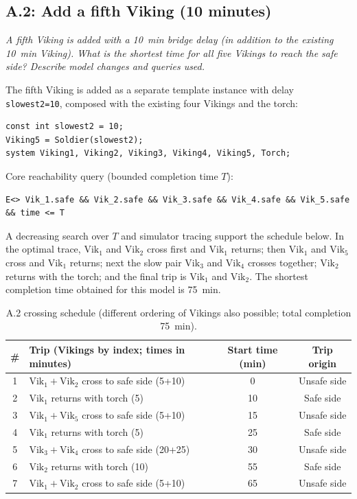 \documentclass[10pt]{article}
\newcommand{\Vik}[1]{\ensuremath{\mathrm{Vik}_{#1}}}
\newcommand{\afterprompt}{\par\medskip}
\begin{document}
\subsection*{A.2: Add a fifth Viking (10 minutes)}
\textit{A fifth Viking is added with a \SI{10}{min} bridge delay (in addition to the existing \SI{10}{min} Viking). What is the shortest time for all five Vikings to reach the safe side? Describe model changes and queries used.}
\afterprompt
The fifth Viking is added as a separate template instance with delay \texttt{slowest2=10}, composed with the existing four Vikings and the torch:
\begin{lstlisting}[style=uppaal]
const int slowest2 = 10;
Viking5 = Soldier(slowest2);
system Viking1, Viking2, Viking3, Viking4, Viking5, Torch;
\end{lstlisting}
Core reachability query (bounded completion time $T$):
\begin{lstlisting}[style=uppaal]
E<> Vik_1.safe && Vik_2.safe && Vik_3.safe && Vik_4.safe && Vik_5.safe && time <= T
\end{lstlisting}
A decreasing search over $T$ and simulator tracing support the schedule below. In the optimal trace, $\Vik{1}$ and $\Vik{2}$ cross first and $\Vik{1}$ returns; then $\Vik{1}$ and $\Vik{5}$ cross and $\Vik{1}$ returns; next the slow pair $\Vik{3}$ and $\Vik{4}$ crosses together; $\Vik{2}$ returns with the torch; and the final trip is $\Vik{1}$ and $\Vik{2}$. The shortest completion time obtained for this model is \SI{75}{min}.

\begin{table}[H]
\centering
\begin{tabular}{c >{\raggedright\arraybackslash}p{} c c}
\toprule
\# & Trip (Vikings by index; times in minutes) & Start time (\si{min}) & Trip origin \\
\midrule
1 & $\Vik{1}+\Vik{2}$ cross to safe side (5+10) & 0 & Unsafe side \\
2 & $\Vik{1}$ returns with torch (5) & 10 & Safe side \\
3 & $\Vik{1}+\Vik{5}$ cross to safe side (5+10) & 15 & Unsafe side \\
4 & $\Vik{1}$ returns with torch (5) & 25 & Safe side \\
5 & $\Vik{3}+\Vik{4}$ cross to safe side (20+25) & 30 & Unsafe side \\
6 & $\Vik{2}$ returns with torch (10) & 55 & Safe side \\
7 & $\Vik{1}+\Vik{2}$ cross to safe side (5+10) & 65 & Unsafe side \\
\bottomrule
\end{tabular}
\caption{A.2 crossing schedule (different ordering of Vikings also possible; total completion \SI{75}{min}).}
\label{tab:a2_schedule}
\end{table}
\end{document}
